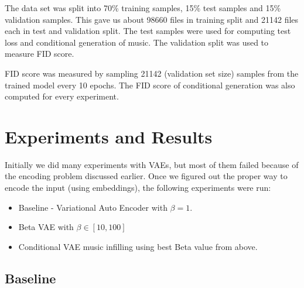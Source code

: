 \documentclass{article}
\begin{document}
The data set was split into 70\% training samples, 15\% test samples and 15\% validation samples. This gave us about 98660 files in training split and 21142 files each in test and validation split. The test samples were used for computing test loss and conditional generation of music. The validation split was used to measure FID score.

FID score was measured by sampling 21142 (validation set size) samples from the trained model every 10 epochs. The FID score of conditional generation was also computed for every experiment.

\section{Experiments and Results}

Initially we did many experiments with VAEs, but most of them failed because of the encoding problem discussed earlier. Once we figured out the proper way to encode the input (using embeddings), the following experiments were run:

\begin{itemize}
\item Baseline - Variational Auto Encoder with $\beta = 1$.
\item Beta VAE with $\beta \in [10, 100]$
\item Conditional VAE music infilling using best Beta value from above.
\end{itemize}

\subsection{Baseline}
\end{document}
